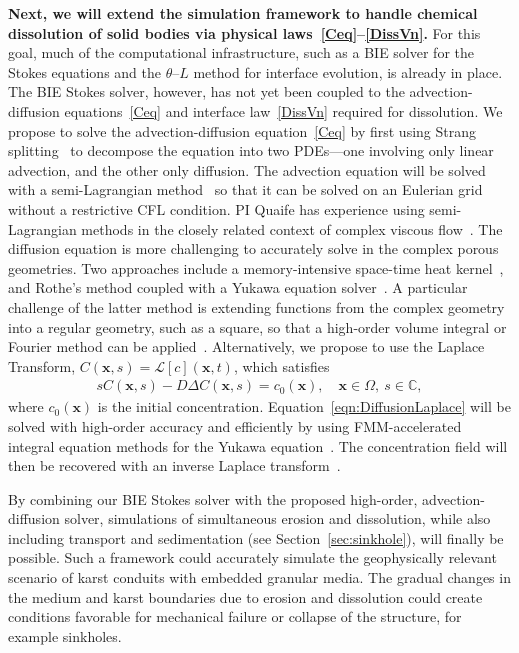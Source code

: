 \documentclass[11pt]{article}
\newcommand{\bvec}[1]{{\mathbf{#1}}}
\newcommand{\xx}{\bvec{x}}
\newcommand{\thL}{$\theta$--$L$}
\begin{document}
{\bf Next, we will extend the simulation framework to handle chemical dissolution of solid bodies via physical laws~\eqref{Ceq}--\eqref{DissVn}.} For this goal, much of the computational infrastructure, such as a BIE solver for the Stokes equations and the {\thL} method for interface evolution, is already in place. The BIE Stokes solver, however, has not yet been coupled to the advection-diffusion equations~\eqref{Ceq} and interface law~\eqref{DissVn} required for dissolution.  We propose to solve the advection-diffusion equation~\eqref{Ceq} by first using Strang splitting~\cite{str1968} to decompose the equation into two PDEs---one involving only linear advection, and the other only diffusion.  The advection equation will be solved with a semi-Lagrangian method~\cite{rob1981} so that it can be solved on an Eulerian grid without a restrictive CFL condition. PI Quaife has experience using semi-Lagrangian methods in the closely related context of complex viscous flow~\cite{kab-qua-bir2017}.  The diffusion equation is more challenging to accurately solve in the complex porous geometries.  Two approaches include a memory-intensive space-time heat kernel~\cite{bar-eps-gre-jia-wan2019, jia-gre-wan2015, li-gre2009}, and Rothe's method coupled with a Yukawa equation solver~\cite{kro-qua2010, cau-cho-chr-sea2016}. A particular challenge of the latter method is extending functions from the complex geometry into a regular geometry, such as a square, so that a high-order volume integral or Fourier method can be applied~\cite{fry-kro-tor2019, fry-leh-tor2019}. Alternatively, we propose to use the Laplace Transform, $C(\xx,s) = \mathcal{L}[c](\xx,t)$, which satisfies
\begin{align}
  sC(\xx,s) - D\Delta C(\xx,s) = c_0(\xx), 
    \quad \xx \in \Omega, \: s \in \mathbb{C},
  \label{eqn:DiffusionLaplace}
\end{align}
where $c_0(\xx)$ is the initial concentration. Equation~\eqref{eqn:DiffusionLaplace} will be solved with high-order accuracy and efficiently by using FMM-accelerated integral equation methods for the Yukawa equation~\cite{kro-qua2011}. The concentration field will then be recovered with an inverse Laplace transform~\cite{jos-war2006}.  

By combining our BIE Stokes solver with the proposed high-order, advection-diffusion solver, simulations of simultaneous erosion and dissolution, while also including transport and sedimentation (see Section~\ref{sec:sinkhole}), will finally be possible.  Such a framework could accurately simulate the geophysically relevant scenario of karst conduits with embedded granular media. The gradual changes in the medium and karst boundaries due to erosion and dissolution could create conditions favorable for mechanical failure or collapse of the structure, for example sinkholes.
\end{document}
